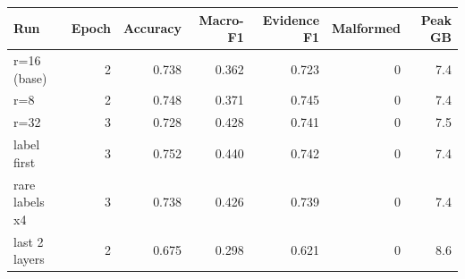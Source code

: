 \begin{tabular}{lrrrrrr}
\toprule
Run & Epoch & Accuracy & Macro-F1 & Evidence F1 & Malformed & Peak GB \\
\midrule
r=16 (base) & 2 & 0.738 & 0.362 & 0.723 & 0 & 7.4 \\
r=8 & 2 & 0.748 & 0.371 & 0.745 & 0 & 7.4 \\
r=32 & 3 & 0.728 & 0.428 & 0.741 & 0 & 7.5 \\
label first & 3 & 0.752 & 0.440 & 0.742 & 0 & 7.4 \\
rare labels x4 & 3 & 0.738 & 0.426 & 0.739 & 0 & 7.4 \\
last 2 layers & 2 & 0.675 & 0.298 & 0.621 & 0 & 8.6 \\
\bottomrule
\end{tabular}
